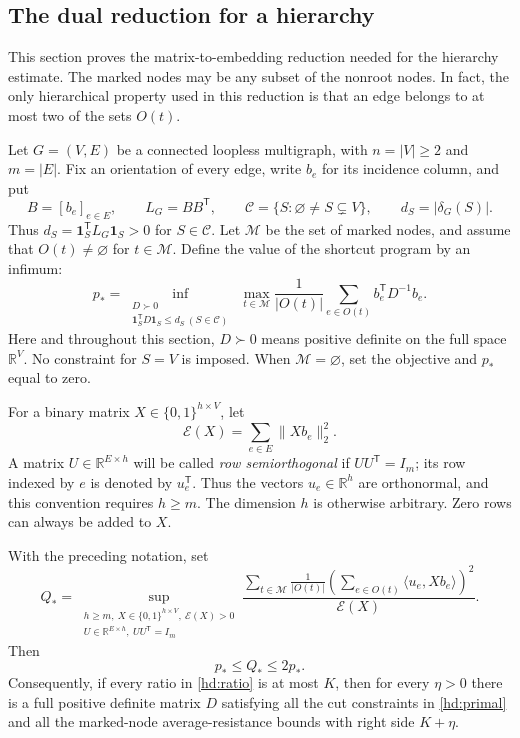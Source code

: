 \subsection{The dual reduction for a hierarchy}
\label{app:hierarchy-dual}

This section proves the matrix-to-embedding reduction needed for the
hierarchy estimate.  The marked nodes may be any subset of the nonroot
nodes.  In fact, the only hierarchical property used in this reduction is
that an edge belongs to at most two of the sets $O(t)$.

Let $G=(V,E)$ be a connected loopless multigraph, with $n=|V|\geq2$
and $m=|E|$.  Fix an orientation of every edge, write $b_e$ for its
incidence column, and put
\[
 B=[b_e]_{e\in E},\qquad L_G=BB^{\mathsf T},\qquad
 \mathcal C=\{S:\varnothing\ne S\subsetneq V\},\qquad
 d_S=|\delta_G(S)|.
\]
Thus $d_S=\mathbf1_S^{\mathsf T}L_G\mathbf1_S>0$ for $S\in\mathcal C$.
Let $\mathcal M$ be the set of marked nodes, and assume that
$O(t)\ne\varnothing$ for $t\in\mathcal M$.  Define the value of
the shortcut program by an infimum:
\begin{equation}
\label{hd:primal}
 p_*=
 \inf_{\substack{D\succ0\\
       \mathbf1_S^{\mathsf T}D\mathbf1_S\leq d_S\ (S\in\mathcal C)}}
 \ \max_{t\in\mathcal M}
 \frac1{|O(t)|}\sum_{e\in O(t)} b_e^{\mathsf T}D^{-1}b_e.
\end{equation}
Here and throughout this section, $D\succ0$ means positive definite on
the full space $\mathbb R^V$.  No constraint for $S=V$ is imposed.
When $\mathcal M=\varnothing$, set the objective and $p_*$ equal to zero.

For a binary matrix $X\in\{0,1\}^{h\times V}$, let
\[
 \mathcal E(X)=\sum_{e\in E}\|Xb_e\|_2^2.
\]
A matrix $U\in\mathbb R^{E\times h}$ will be called
\emph{row semiorthogonal} if $UU^{\mathsf T}=I_m$; its row indexed by
$e$ is denoted by $u_e^{\mathsf T}$.  Thus the vectors $u_e\in\mathbb R^h$
are orthonormal, and this convention requires $h\geq m$.  The dimension
$h$ is otherwise arbitrary.  Zero rows can always be added to $X$.

\begin{lemma}
\label{lem:hierarchy-dual}
With the preceding notation, set
\begin{equation}
\label{hd:ratio}
 Q_*=
 \sup_{\substack{h\geq m,\ X\in\{0,1\}^{h\times V},\ \mathcal E(X)>0\\
                  U\in\mathbb R^{E\times h},\ UU^{\mathsf T}=I_m}}
 \frac{\displaystyle
       \sum_{t\in\mathcal M}\frac1{|O(t)|}
       \left(\sum_{e\in O(t)}\langle u_e,Xb_e\rangle\right)^2}
      {\mathcal E(X)}.
\end{equation}
Then
\begin{equation}
\label{hd:comparison}
 p_*\leq Q_*\leq2p_*.
\end{equation}
Consequently, if every ratio in \eqref{hd:ratio} is at most $K$, then for
every $\eta>0$ there is a full positive definite matrix $D$ satisfying
all the cut constraints in \eqref{hd:primal} and all the marked-node
average-resistance bounds with right side $K+\eta$.
\end{lemma}

